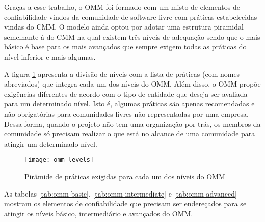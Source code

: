 Graças a esse trabalho, o OMM foi formado com um misto de elementos de
confiabilidade vindos da comunidade de software livre com práticas
estabelecidas vindas do CMM. O modelo ainda optou por adotar uma
estrutura piramidal semelhante à do CMM na qual existem três níveis de
adequação sendo que o mais básico é base para os mais avançados que
sempre exigem todas as práticas do nível inferior e mais algumas.

A figura \ref{fig:piramide-omm} apresenta a divisão de níveis com a
lista de práticas (com nomes abreviados) que integra cada um dos
níveis do OMM. Além disso, o OMM propõe exigências diferentes de
acordo com o tipo de entidade que deseja ser avaliada para um
determinado nível. Isto é, algumas práticas são apenas recomendadas e
não obrigatórias para comunidades livres não representadas por uma
empresa. Dessa forma, quando o projeto não tem uma organização por
trás, os membros da comunidade só precisam realizar o que está no
alcance de uma comunidade para atingir um determinado nível.

\begin{figure}
  \centering
  \texttt{[image: omm-levels]}
  \caption{Pirâmide de práticas exigidas para cada um dos níveis do
    OMM}
  \label{fig:piramide-omm}
\end{figure}

As tabelas \ref{tab:omm-basic}, \ref{tab:omm-intermediate} e
\ref{tab:omm-advanced} mostram os elementos de confiabilidade que
precisam ser endereçados para se atingir os níveis básico,
intermediário e avançados do OMM.

